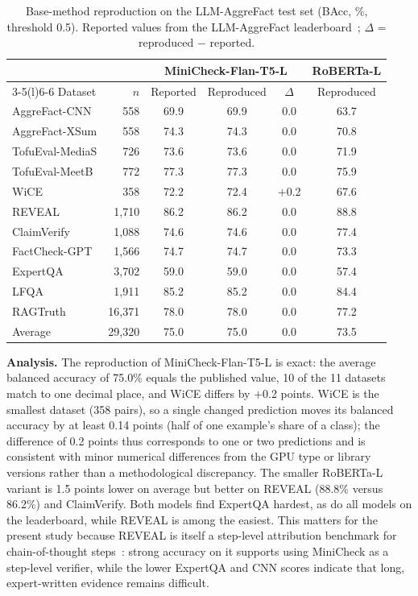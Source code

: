 \documentclass[conference]{IEEEtran}
\begin{document}
\begin{table}[t]
\caption{Base-method reproduction on the LLM-AggreFact test set (BAcc, \%, threshold 0.5). Reported values from the LLM-AggreFact leaderboard~\cite{llmaggrefact2026leaderboard}; $\Delta$ = reproduced $-$ reported.}\label{tab:repro}
\centering\footnotesize
\setlength{\tabcolsep}{4pt}
\begin{tabular}{@{}lrcccc@{}}
\toprule
 & & \multicolumn{3}{c}{MiniCheck-Flan-T5-L} & RoBERTa-L \\
\cmidrule(lr){3-5}\cmidrule(l){6-6}
Dataset & $n$ & Reported & Reproduced & $\Delta$ & Reproduced \\
\midrule
AggreFact-CNN & 558 & 69.9 & 69.9 & 0.0 & 63.7 \\
AggreFact-XSum & 558 & 74.3 & 74.3 & 0.0 & 70.8 \\
TofuEval-MediaS & 726 & 73.6 & 73.6 & 0.0 & 71.9 \\
TofuEval-MeetB & 772 & 77.3 & 77.3 & 0.0 & 75.9 \\
WiCE & 358 & 72.2 & 72.4 & $+$0.2 & 67.6 \\
REVEAL & 1,710 & 86.2 & 86.2 & 0.0 & 88.8 \\
ClaimVerify & 1,088 & 74.6 & 74.6 & 0.0 & 77.4 \\
FactCheck-GPT & 1,566 & 74.7 & 74.7 & 0.0 & 73.3 \\
ExpertQA & 3,702 & 59.0 & 59.0 & 0.0 & 57.4 \\
LFQA & 1,911 & 85.2 & 85.2 & 0.0 & 84.4 \\
RAGTruth & 16,371 & 78.0 & 78.0 & 0.0 & 77.2 \\
\midrule
Average & 29,320 & 75.0 & 75.0 & 0.0 & 73.5 \\
\bottomrule
\end{tabular}
\end{table}

\textbf{Analysis.} The reproduction of MiniCheck-Flan-T5-L is exact: the average balanced accuracy of 75.0\% equals the published value, 10 of the 11 datasets match to one decimal place, and WiCE differs by $+$0.2 points. WiCE is the smallest dataset (358 pairs), so a single changed prediction moves its balanced accuracy by at least 0.14 points (half of one example's share of a class); the difference of 0.2 points thus corresponds to one or two predictions and is consistent with minor numerical differences from the GPU type or library versions rather than a methodological discrepancy. The smaller RoBERTa-L variant is 1.5 points lower on average but better on REVEAL (88.8\% versus 86.2\%) and ClaimVerify. Both models find ExpertQA hardest, as do all models on the leaderboard, while REVEAL is among the easiest. This matters for the present study because REVEAL is itself a step-level attribution benchmark for chain-of-thought steps~\cite{jacovi2024reveal}: strong accuracy on it supports using MiniCheck as a step-level verifier, while the lower ExpertQA and CNN scores indicate that long, expert-written evidence remains difficult.
\end{document}
